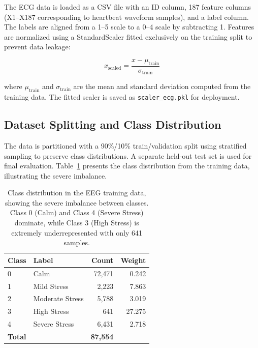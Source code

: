 \documentclass[12pt,letterpaper]{report}
\begin{document}
The ECG data is loaded as a CSV file with an ID column, 187 feature columns (X1--X187 corresponding to heartbeat waveform samples), and a label column. The labels are aligned from a 1--5 scale to a 0--4 scale by subtracting 1. Features are normalized using a StandardScaler fitted exclusively on the training split to prevent data leakage:

\begin{equation}
\label{eq:standard_scaling}
x_{\text{scaled}} = \frac{x - \mu_{\text{train}}}{\sigma_{\text{train}}}
\end{equation}

\noindent where $\mu_{\text{train}}$ and $\sigma_{\text{train}}$ are the mean and standard deviation computed from the training data. The fitted scaler is saved as \texttt{scaler\_ecg.pkl} for deployment.

\subsection{Dataset Splitting and Class Distribution}
\label{subsec:splitting}

The data is partitioned with a 90\%/10\% train/validation split using stratified sampling to preserve class distributions. A separate held-out test set is used for final evaluation. Table~\ref{tab:class_dist} presents the class distribution from the training data, illustrating the severe imbalance.

\begin{table}[H]
\centering
\caption[Training data class distribution]{Class distribution in the EEG training data, showing the severe imbalance between classes. Class 0 (Calm) and Class 4 (Severe Stress) dominate, while Class 3 (High Stress) is extremely underrepresented with only 641 samples.}
\label{tab:class_dist}
\begin{tabular}{llrr}
\toprule
\textbf{Class} & \textbf{Label} & \textbf{Count} & \textbf{Weight} \\
\midrule
0 & Calm & 72,471 & 0.242 \\
1 & Mild Stress & 2,223 & 7.863 \\
2 & Moderate Stress & 5,788 & 3.019 \\
3 & High Stress & 641 & 27.275 \\
4 & Severe Stress & 6,431 & 2.718 \\
\midrule
\textbf{Total} & & \textbf{87,554} & \\
\bottomrule
\end{tabular}
\end{table}
\end{document}
